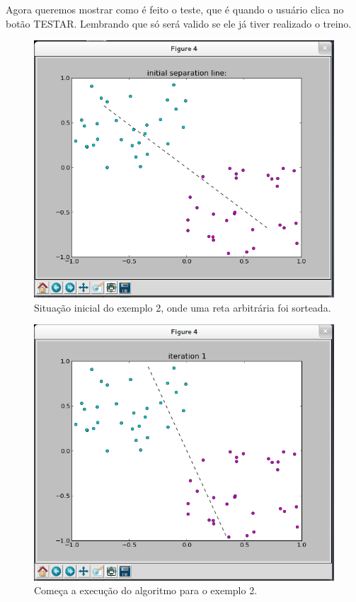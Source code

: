 \documentclass[brazil, a4paper]{article}
\begin{document}
\begin{description}
Agora queremos mostrar como é feito o teste, que é quando o usuário clica no
botão TESTAR. Lembrando que só será valido se ele já tiver realizado o treino.

\newpage

\begin{figure}[!htb]
\centering
\includegraphics[scale=0.42]{ex2-1.png}
\caption{Situação inicial do exemplo 2, onde uma reta arbitrária foi sorteada.}
\end{figure}

\begin{figure}[!htb]
\centering
\includegraphics[scale=0.42]{ex2-2.png}
\caption{Começa a execução do algoritmo para o exemplo 2.}
\end{figure}


\end{description}
\end{document}
